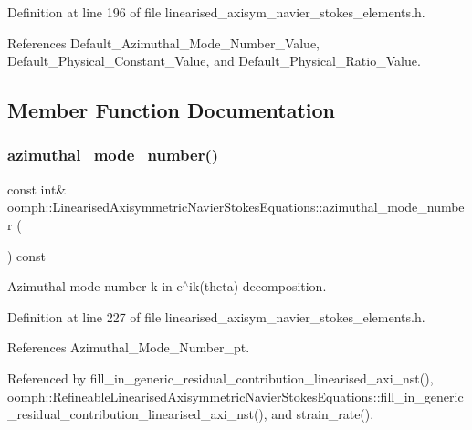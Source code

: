Definition at line 196 of file linearised\+\_\+axisym\+\_\+navier\+\_\+stokes\+\_\+elements.\+h.



References Default\+\_\+\+Azimuthal\+\_\+\+Mode\+\_\+\+Number\+\_\+\+Value, Default\+\_\+\+Physical\+\_\+\+Constant\+\_\+\+Value, and Default\+\_\+\+Physical\+\_\+\+Ratio\+\_\+\+Value.



\subsection{Member Function Documentation}
\mbox{\label{classoomph_1_1LinearisedAxisymmetricNavierStokesEquations_ad587b06cece88eaf6e2774b3bee562c8}} 
\subsubsection{\texorpdfstring{azimuthal\+\_\+mode\+\_\+number()}{azimuthal\_mode\_number()}}
{\footnotesize\ttfamily const int\& oomph\+::\+Linearised\+Axisymmetric\+Navier\+Stokes\+Equations\+::azimuthal\+\_\+mode\+\_\+number (\begin{DoxyParamCaption}{ }\end{DoxyParamCaption}) const\hspace{0.3cm}{\ttfamily [inline]}}



Azimuthal mode number k in e$^\wedge$ik(theta) decomposition. 



Definition at line 227 of file linearised\+\_\+axisym\+\_\+navier\+\_\+stokes\+\_\+elements.\+h.



References Azimuthal\+\_\+\+Mode\+\_\+\+Number\+\_\+pt.



Referenced by fill\+\_\+in\+\_\+generic\+\_\+residual\+\_\+contribution\+\_\+linearised\+\_\+axi\+\_\+nst(), oomph\+::\+Refineable\+Linearised\+Axisymmetric\+Navier\+Stokes\+Equations\+::fill\+\_\+in\+\_\+generic\+\_\+residual\+\_\+contribution\+\_\+linearised\+\_\+axi\+\_\+nst(), and strain\+\_\+rate().

